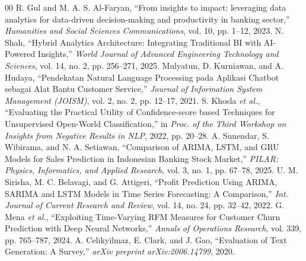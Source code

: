 \documentclass[conference]{IEEEtran}
\begin{document}
\begin{thebibliography}{00} \footnotesize
{} R. Gul and M. A. S. Al-Faryan, ``From insights to impact: leveraging data analytics for data-driven decision-making and productivity in banking sector,'' \textit{Humanities and Social Sciences Communications}, vol. 10, pp. 1--12, 2023.
 N. Shah, ``Hybrid Analytics Architecture: Integrating Traditional BI with AI-Powered Insights,'' \textit{World Journal of Advanced Engineering Technology and Sciences}, vol. 14, no. 2, pp. 256--271, 2025.
 Mulyatun, D. Kurniawan, and A. Hudaya, ``Pendekatan Natural Language Processing pada Aplikasi Chatbot sebagai Alat Bantu Customer Service,'' \textit{Journal of Information System Management (JOISM)}, vol. 2, no. 2, pp. 12--17, 2021.
 S. Khosla \textit{et al.}, ``Evaluating the Practical Utility of Confidence-score based Techniques for Unsupervised Open-World Classification,'' in \textit{Proc. of the Third Workshop on Insights from Negative Results in NLP}, 2022, pp. 20--28.
 A. Sunendar, S. Wibirama, and N. A. Setiawan, ``Comparison of ARIMA, LSTM, and GRU Models for Sales Prediction in Indonesian Banking Stock Market,'' \textit{PILAR: Physics, Informatics, and Applied Research}, vol. 3, no. 1, pp. 67--78, 2025.
 U. M. Sirisha, M. C. Belavagi, and G. Attigeri, ``Profit Prediction Using ARIMA, SARIMA and LSTM Models in Time Series Forecasting: A Comparison,'' \textit{Int. Journal of Current Research and Review}, vol. 14, no. 24, pp. 32--42, 2022.
 G. Mena \textit{et al.}, ``Exploiting Time-Varying RFM Measures for Customer Churn Prediction with Deep Neural Networks,'' \textit{Annals of Operations Research}, vol. 339, pp. 765--787, 2024.
 A. Celikyilmaz, E. Clark, and J. Gao, ``Evaluation of Text Generation: A Survey,'' \textit{arXiv preprint arXiv:2006.14799}, 2020.
\end{thebibliography}
\end{document}
